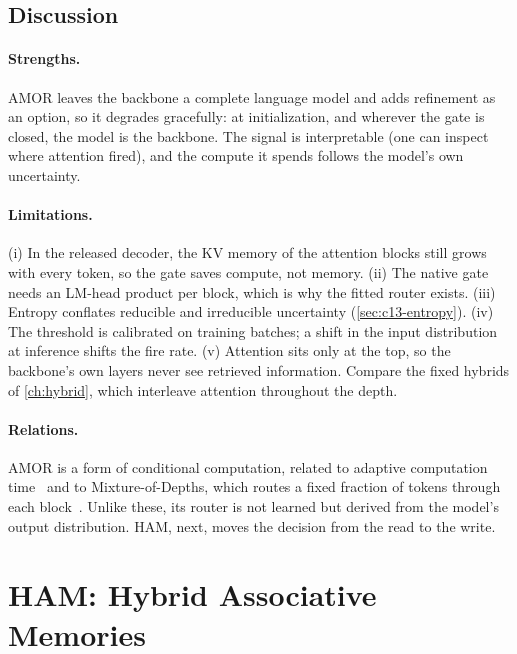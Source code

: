 \subsection{Discussion}

\paragraph{Strengths.} AMOR leaves the backbone a complete language model and adds refinement as an
option, so it degrades gracefully: at initialization, and wherever the gate is closed, the model is
the backbone. The signal is interpretable (one can inspect where attention fired), and the compute it
spends follows the model's own uncertainty.

\paragraph{Limitations.} (i) In the released decoder, the KV memory of the attention blocks still grows
with every token, so the gate saves compute, not memory. (ii) The native gate needs an LM-head product per
block, which is why the fitted router exists. (iii) Entropy conflates reducible and irreducible
uncertainty (\cref{sec:c13-entropy}). (iv) The threshold is calibrated on training batches; a shift in
the input distribution at inference shifts the fire rate. (v) Attention sits only at the top, so the
backbone's own layers never see retrieved information. Compare the fixed hybrids of \cref{ch:hybrid},
which interleave attention throughout the depth.

\paragraph{Relations.} AMOR is a form of conditional computation, related to adaptive computation
time~\citep{c13-graves2016act} and to Mixture-of-Depths, which routes a fixed fraction of tokens through
each block~\citep{c13-raposo2024mod}. Unlike these, its router is not learned but derived from the
model's output distribution. HAM, next, moves the decision from the read to the write.

\section{HAM: Hybrid Associative Memories}\label{sec:c13-ham}

